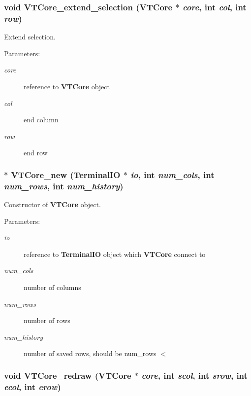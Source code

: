 \subsubsection{\setlength{\rightskip}{0pt plus 5cm}void VTCore\_\-extend\_\-selection ({\bf VTCore} $\ast$ {\em core}, int {\em col}, int {\em row})}\label{core_8h_a53}


Extend selection.

\begin{Desc}
\item[Parameters:]
\begin{description}
\item[{\em core}]reference to {\bf VTCore} object \item[{\em col}]end column \item[{\em row}]end row \end{description}
\end{Desc}
\subsubsection{$\ast$ VTCore\_\-new ({\bf Terminal\-IO} $\ast$ {\em io}, int {\em num\_\-cols}, int {\em num\_\-rows}, int {\em num\_\-history})}\label{core_8h_a45}


Constructor of {\bf VTCore} object.

\begin{Desc}
\item[Parameters:]
\begin{description}
\item[{\em io}]reference to {\bf Terminal\-IO} object which {\bf VTCore} connect to \item[{\em num\_\-cols}]number of columns \item[{\em num\_\-rows}]number of rows \item[{\em num\_\-history}]number of saved rows, should be num\_\-rows $<$ \end{description}
\end{Desc}
\subsubsection{\setlength{\rightskip}{0pt plus 5cm}void VTCore\_\-redraw ({\bf VTCore} $\ast$ {\em core}, int {\em scol}, int {\em srow}, int {\em ecol}, int {\em erow})}\label{core_8h_a49}



